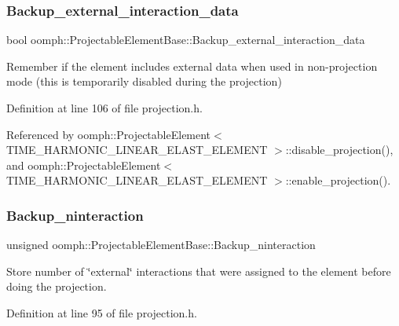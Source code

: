 \subsubsection{\texorpdfstring{Backup\+\_\+external\+\_\+interaction\+\_\+data}{Backup\_external\_interaction\_data}}
{\footnotesize\ttfamily bool oomph\+::\+Projectable\+Element\+Base\+::\+Backup\+\_\+external\+\_\+interaction\+\_\+data\hspace{0.3cm}{\ttfamily [protected]}}



Remember if the element includes external data when used in non-\/projection mode (this is temporarily disabled during the projection) 



Definition at line 106 of file projection.\+h.



Referenced by oomph\+::\+Projectable\+Element$<$ T\+I\+M\+E\+\_\+\+H\+A\+R\+M\+O\+N\+I\+C\+\_\+\+L\+I\+N\+E\+A\+R\+\_\+\+E\+L\+A\+S\+T\+\_\+\+E\+L\+E\+M\+E\+N\+T $>$\+::disable\+\_\+projection(), and oomph\+::\+Projectable\+Element$<$ T\+I\+M\+E\+\_\+\+H\+A\+R\+M\+O\+N\+I\+C\+\_\+\+L\+I\+N\+E\+A\+R\+\_\+\+E\+L\+A\+S\+T\+\_\+\+E\+L\+E\+M\+E\+N\+T $>$\+::enable\+\_\+projection().

\mbox{\label{classoomph_1_1ProjectableElementBase_a638bf48f5b8dd513c18413cd3878c0d1}} 
\subsubsection{\texorpdfstring{Backup\+\_\+ninteraction}{Backup\_ninteraction}}
{\footnotesize\ttfamily unsigned oomph\+::\+Projectable\+Element\+Base\+::\+Backup\+\_\+ninteraction\hspace{0.3cm}{\ttfamily [protected]}}



Store number of \char`\"{}external\char`\"{} interactions that were assigned to the element before doing the projection. 



Definition at line 95 of file projection.\+h.



